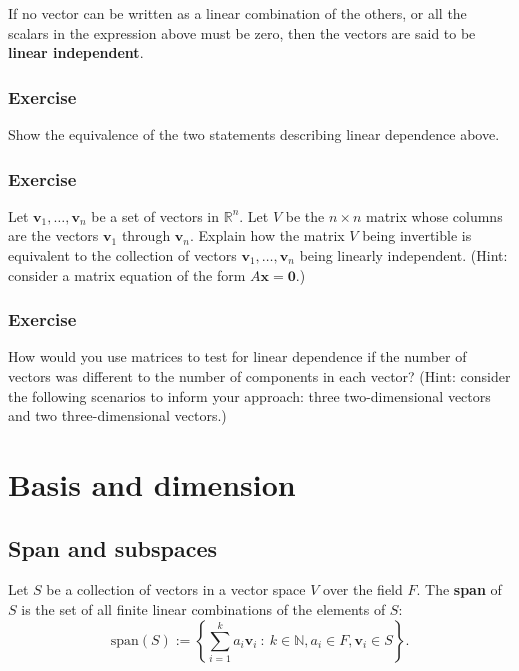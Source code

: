 \documentclass[a4paper,12pt]{amsart}
\begin{document}
    If no vector can be written as a linear combination of the others, or all the scalars in the expression above must be zero, then the vectors are said to be \textbf{linear independent}.

    \subsubsection{Exercise} Show the equivalence of the two statements describing linear dependence above.

    \subsubsection{Exercise} Let $\mathbf{v}_1, \ldots, \mathbf{v}_n$ be a set of vectors in $\mathbb{R}^n$. Let $V$ be the $n \times n$ matrix whose columns are the vectors $\mathbf{v}_1$ through $\mathbf{v}_n$. Explain how the matrix $V$ being invertible is equivalent to the collection of vectors $\mathbf{v}_1, \ldots, \mathbf{v}_n$ being linearly independent. (Hint: consider a matrix equation of the form $A\mathbf{x} = \mathbf{0}$.)

    \subsubsection{Exercise} How would you use matrices to test for linear dependence if the number of vectors was different to the number of components in each vector? (Hint: consider the following scenarios to inform your approach: three two-dimensional vectors and two three-dimensional vectors.)

    \section{Basis and dimension}

    \subsection{Span and subspaces} Let $S$ be a collection of vectors in a vector space $V$ over the field $F$. The \textbf{span} of $S$ is the set of all finite linear combinations of the elements of $S$:
    \[ \mathrm{span} (S) := \left\{ \sum_{i=1}^k a_i \mathbf{v}_i \: : \: k \in \mathbb{N}, a_i \in F, \mathbf{v}_i \in S \right \}. \]
    
\end{document}
